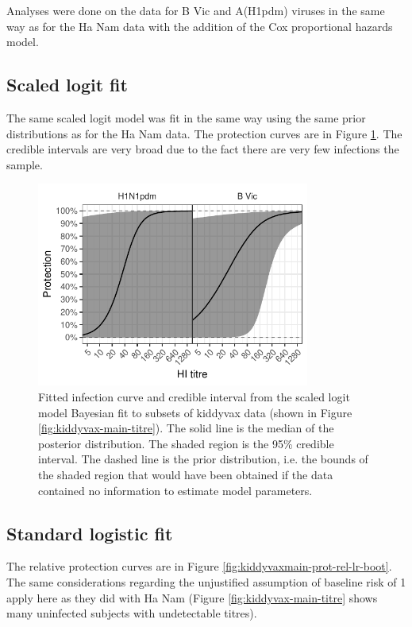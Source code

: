 \documentclass[12pt]{article}
\begin{document}
Analyses were done on the data for B Vic and A(H1pdm) viruses in the same way as for the Ha Nam data with the addition of the Cox proportional hazards model.

%
\subsection{Scaled logit fit}

The same scaled logit model was fit in the same way using the same prior distributions as for the Ha Nam data. The protection curves are in Figure \ref{fig:kiddyvaxmain-prot-bayes-sclr}. The credible intervals are very broad due to the fact there are very few infections the sample.

\begin{figure}[htp]
	\centering
	\includegraphics[width=0.8\textwidth]{../fit-sclr-bayesian-plot/kiddyvaxmain-prot.pdf}
	\caption{
Fitted infection curve and credible interval from the scaled logit model Bayesian fit to subsets of kiddyvax data (shown in Figure \ref{fig:kiddyvax-main-titre}). The solid line is the median of the posterior distribution. The shaded region is the 95\% credible interval. The dashed line is the prior distribution, i.e. the bounds of the shaded region that would have been obtained if the data contained no information to estimate model parameters.
	}
	\label{fig:kiddyvaxmain-prot-bayes-sclr}
\end{figure}



%
\subsection{Standard logistic fit}

The relative protection curves are in Figure \ref{fig:kiddyvaxmain-prot-rel-lr-boot}. The same considerations regarding the unjustified assumption of baseline risk of 1 apply here as they did with Ha Nam (Figure \ref{fig:kiddyvax-main-titre} shows many uninfected subjects with undetectable titres).
\end{document}
